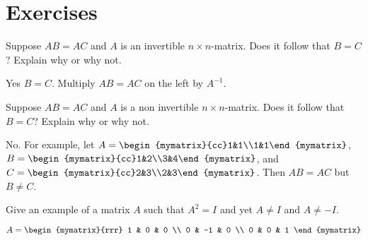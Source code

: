 \section*{Exercises}

\begin{enumialphparenastyle}

\begin{ex}
  Suppose $AB=AC$ and $A$ is an invertible $n\times n$-matrix. Does it
  follow that $B=C$? Explain why or why not.
  \begin{sol}
    Yes $B=C$. Multiply $AB = AC$ on the left by $A^{-1}$. 
  \end{sol}
\end{ex}

\begin{ex}
  Suppose $AB=AC$ and $A$ is a non invertible $n\times n$-matrix. Does
  it follow that $B=C$? Explain why or why not.
  \begin{sol}
    No. For example, let
    $A=\begin{mymatrix}{cc}1&1\\1&1\end{mymatrix}$,
    $B=\begin{mymatrix}{cc}1&2\\3&4\end{mymatrix}$, and
    $C=\begin{mymatrix}{cc}2&3\\2&3\end{mymatrix}$. Then $AB=AC$ but
    $B\neq C$.
  \end{sol}
\end{ex}

\begin{ex}
  Give an example of a matrix $A$ such that $A^{2}=I$ and yet
  $A\neq I$ and $A\neq -I$.
  \begin{sol}
    $A = \begin{mymatrix}{rrr}
      1 & 0 & 0 \\
      0 & -1 & 0 \\
      0 & 0 & 1
    \end{mymatrix} $
  \end{sol}
\end{ex}

\end{enumialphparenastyle}
